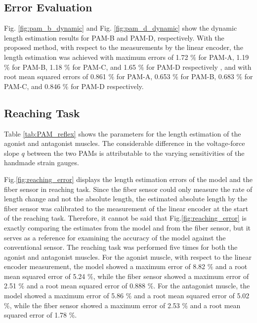 \vspace{1cm}

\subsection{Error Evaluation} 
Fig. \ref{fig:pam_b_dynamic} and Fig. \ref{fig:pam_d_dynamic} show the dynamic length estimation results for PAM-B and PAM-D, respectively.
With the proposed method, with respect to the measurements by the linear encoder, the length estimation was achieved with maximum errors of 1.72 $\%$ for PAM-A, 1.19 $\%$ for PAM-B, 1.18 $\%$ for PAM-C, and  1.65 $\%$ for PAM-D respectively , and with root mean squared errors of 0.861 $\%$ for PAM-A, 0.653 $\%$ for PAM-B, 0.683 $\%$ for PAM-C, and 0.846 $\%$ for PAM-D respectively.

\subsection{Reaching Task}
Table \ref{tab:PAM_reflex} shows the parameters for the length estimation of the agonist and antagonist muscles. The considerable difference in the voltage-force slope $q$ between the two PAMs is attributable to the varying sensitivities of the handmade strain gauges.

Fig.\ref{fig:reaching_error} displays the length estimation errors of the model and the fiber sensor in reaching task. Since the fiber sensor could only measure the rate of length change and not the absolute length, the estimated absolute length by the fiber sensor was calibrated to the measurement of the linear encoder at the start of the reaching task. Therefore, it cannot be said that Fig.\ref{fig:reaching_error} is exactly comparing the estimates from the model and from the fiber sensor, but it serves as a reference for examining the accuracy of the model against the conventional sensor. The reaching task was performed five times for both the agonist and antagonist muscles. For the agonist muscle, with respect to the linear encoder measurement, the model showed a maximum error of 8.82 $\%$ and a root mean squared error of 5.24 $\%$, while the fiber sensor showed a maximum error of 2.51 $\%$ and a root mean squared error of 0.888 $\%$. For the antagonist muscle, the model showed a maximum error of 5.86 $\%$ and a root mean squared error of 5.02 $\%$, while the fiber sensor showed a maximum error of 2.53 $\%$ and a root mean squared error of 1.78 $\%$. 

